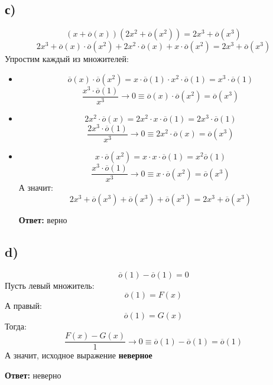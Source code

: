 \documentclass[a4paper,12pt]{article}
\begin{document}
\subsection*{с)}
\[
(x + \overline{o}(x))(2x^2 + \overline{o}(x^2)) = 2x^3 + \overline{o}(x^3)
\]
\[
2x^3 + \overline{o}(x) \cdot \overline{o}(x^2) + 2x^2 \cdot  \overline{o}(x)  +  x \cdot \overline{o}(x^2)  = 2x^3 + \overline{o}(x^3)
\]
Упростим каждый из множителей:
\begin{itemize}
\item 
\[
\overline{o}(x) \cdot \overline{o}(x^2) = x \cdot \overline{o}(1) \cdot x^2 \cdot \overline{o}(1) = x^3 \cdot  \overline{o}(1) 
\]
\[
\frac{x^3 \cdot \overline{o}(1)}{x^3} \rightarrow 0 \equiv \overline{o}(x) \cdot \overline{o}(x^2) = \overline{o}(x^3)
\]
\item
\[
2x^2 \cdot \overline{o}(x) = 2x^2 \cdot x \cdot \overline{o}(1) = 2x^3 \cdot \overline{o}(1)
\]
\[
\frac{2x^3 \cdot \overline{o}(1)}{x^3} \rightarrow 0 \equiv 2x^2 \cdot \overline{o}(x) = \overline{o}(x^3)
\]
\item
\[
x \cdot \overline{o}(x^2) = x \cdot x \cdot \overline{o}(1) = x^2 \overline{o}(1)
\]
\[
\frac{x^3 \cdot \overline{o}(1)}{x^3} \rightarrow 0 \equiv x \cdot \overline{o}(x^2) = \overline{o}(x^3)
\]
А значит:
\[
2x^3  + \overline{o}(x^3) + \overline{o}(x^3) + \overline{o}(x^3) = 2x^3 + \overline{o}(x^3)
\]
\begin{center}
\textbf{Ответ:} верно
\end{center}
\end{itemize}
\subsection*{d)}
\[
\overline{o}(1) - \overline{o}(1) = 0
\]
Пусть левый множитель:
\[
\overline{o}(1) = F(x)
\]
А правый:
\[
\overline{o}(1) = G(x)
\]
Тогда:
\[
\frac{F(x) - G(x)}{1} \rightarrow 0 \equiv \overline{o}(1) - \overline{o}(1) = \overline{o}(1)
\]
А значит, исходное выражение \textbf{неверное}
\begin{center}
\textbf{Ответ:} неверно
\end{center}
\end{document}
